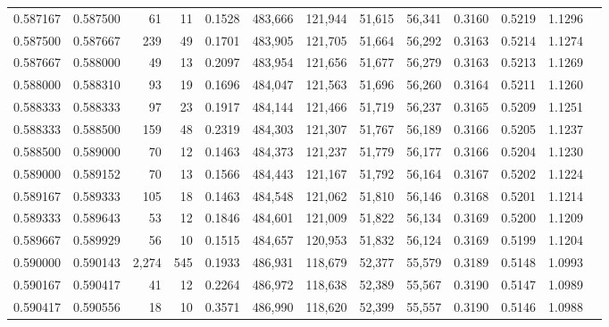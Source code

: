 \begin{tabular}{rrrrrrrrrrrrr}
0.587167 & 0.587500 &    61 &  11 &                                     0.1528 & 483,666 & 121,944 &  51,615 &  56,341 & 0.3160 & 0.5219 & 1.1296 \\
0.587500 & 0.587667 &   239 &  49 &                                     0.1701 & 483,905 & 121,705 &  51,664 &  56,292 & 0.3163 & 0.5214 & 1.1274 \\
0.587667 & 0.588000 &    49 &  13 &                                     0.2097 & 483,954 & 121,656 &  51,677 &  56,279 & 0.3163 & 0.5213 & 1.1269 \\
0.588000 & 0.588310 &    93 &  19 &                                     0.1696 & 484,047 & 121,563 &  51,696 &  56,260 & 0.3164 & 0.5211 & 1.1260 \\
0.588333 & 0.588333 &    97 &  23 &                                     0.1917 & 484,144 & 121,466 &  51,719 &  56,237 & 0.3165 & 0.5209 & 1.1251 \\
0.588333 & 0.588500 &   159 &  48 &                                     0.2319 & 484,303 & 121,307 &  51,767 &  56,189 & 0.3166 & 0.5205 & 1.1237 \\
0.588500 & 0.589000 &    70 &  12 &                                     0.1463 & 484,373 & 121,237 &  51,779 &  56,177 & 0.3166 & 0.5204 & 1.1230 \\
0.589000 & 0.589152 &    70 &  13 &                                     0.1566 & 484,443 & 121,167 &  51,792 &  56,164 & 0.3167 & 0.5202 & 1.1224 \\
0.589167 & 0.589333 &   105 &  18 &                                     0.1463 & 484,548 & 121,062 &  51,810 &  56,146 & 0.3168 & 0.5201 & 1.1214 \\
0.589333 & 0.589643 &    53 &  12 &                                     0.1846 & 484,601 & 121,009 &  51,822 &  56,134 & 0.3169 & 0.5200 & 1.1209 \\
0.589667 & 0.589929 &    56 &  10 &                                     0.1515 & 484,657 & 120,953 &  51,832 &  56,124 & 0.3169 & 0.5199 & 1.1204 \\
0.590000 & 0.590143 & 2,274 & 545 &                                     0.1933 & 486,931 & 118,679 &  52,377 &  55,579 & 0.3189 & 0.5148 & 1.0993 \\
0.590167 & 0.590417 &    41 &  12 &                                     0.2264 & 486,972 & 118,638 &  52,389 &  55,567 & 0.3190 & 0.5147 & 1.0989 \\
0.590417 & 0.590556 &    18 &  10 &                                     0.3571 & 486,990 & 118,620 &  52,399 &  55,557 & 0.3190 & 0.5146 & 1.0988 \\

\end{tabular}
